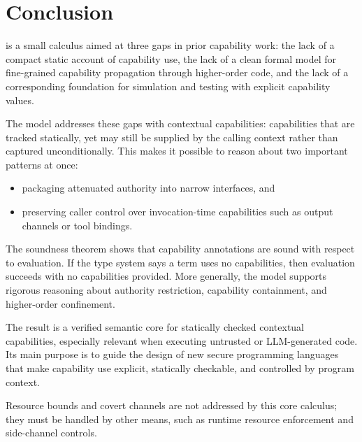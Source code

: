 
\section{Conclusion}
\label{sec:conclusion}

\lambdaCap{} is a small calculus aimed at three gaps in prior capability
work: the lack of a compact static account of capability use, the lack of a
clean formal model for fine-grained capability propagation through
higher-order code, and the lack of a corresponding foundation for simulation
and testing with explicit capability values. %

The model addresses these gaps with contextual capabilities: capabilities
that are tracked statically, yet may still be supplied by the calling context
rather than captured unconditionally. %
This makes it possible to reason about
two important patterns at once:
\begin{itemize}[nosep]
\item packaging attenuated authority into narrow interfaces, and
\item preserving caller control over invocation-time capabilities such as
  output channels or tool bindings. %
\end{itemize}

The soundness theorem shows that capability annotations are sound with
respect to evaluation. %
If the type system says a term uses no capabilities,
then evaluation succeeds with no capabilities provided. %
More generally, the
model supports rigorous reasoning about authority restriction, capability
containment, and higher-order confinement. %

The result is a verified semantic core for statically checked contextual
capabilities, especially relevant when executing untrusted or LLM-generated
code. %
Its main purpose is to guide the design of new secure programming
languages that make capability use explicit, statically checkable, and
controlled by program context. %

Resource bounds and covert channels are not addressed by this core calculus;
they must be handled by other means, such as runtime resource enforcement and
side-channel controls. %
